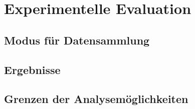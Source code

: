
\chapter{Experimentelle Evaluation}
\label{chap:evaluation}



\section{Modus für Datensammlung}
\label{sec:benchmarks}


\section{Ergebnisse}
\label{sec:results}


\section{Grenzen der Analysemöglichkeiten}

